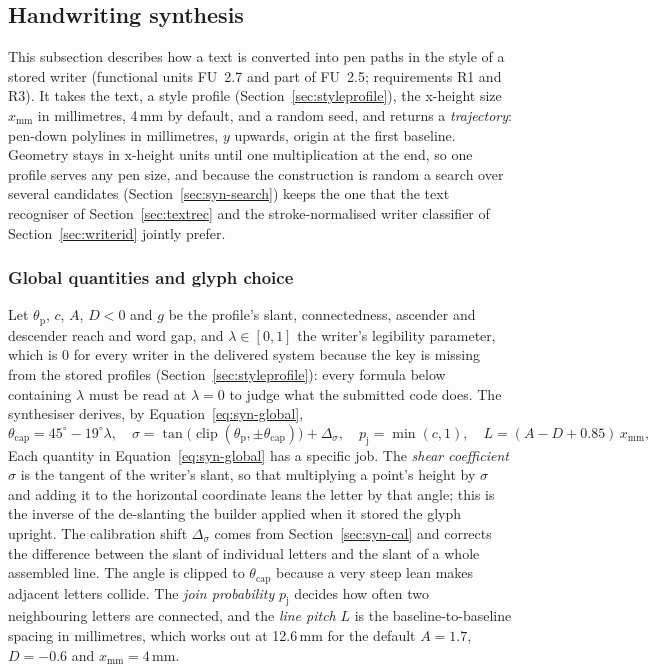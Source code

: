 \subsection{Handwriting synthesis}
\label{sec:synthesis}

This subsection describes how a text is converted into pen paths in the style of a stored writer (functional units FU~2.7 and part of FU~2.5; requirements R1 and R3).
It takes the text, a style profile (Section~\ref{sec:styleprofile}), the x-height size $x_{\mathrm{mm}}$ in millimetres, 4\,mm by default, and a random seed, and returns a \emph{trajectory}: pen-down polylines in millimetres, $y$ upwards, origin at the first baseline.
Geometry stays in x-height units until one multiplication at the end, so one profile serves any pen size, and because the construction is random a search over several candidates (Section~\ref{sec:syn-search}) keeps the one that the text recogniser of Section~\ref{sec:textrec} and the stroke-normalised writer classifier of Section~\ref{sec:writerid} jointly prefer.

\subsubsection{Global quantities and glyph choice}

Let $\theta_{\mathrm p}$, $c$, $A$, $D<0$ and $g$ be the profile's slant, connectedness, ascender and descender reach and word gap, and $\lambda\in[0,1]$ the writer's legibility parameter, which is 0 for every writer in the delivered system because the key is missing from the stored profiles (Section~\ref{sec:styleprofile}): every formula below containing $\lambda$ must be read at $\lambda=0$ to judge what the submitted code does.
The synthesiser derives, by Equation~\ref{eq:syn-global},
\begin{equation}
\theta_{\mathrm{cap}}=45^\circ-19^\circ\lambda,\quad\sigma=\tan\!\bigl(\operatorname{clip}(\theta_{\mathrm p},\pm\theta_{\mathrm{cap}})\bigr)+\Delta_\sigma,\quad p_{\mathrm j}=\min(c,1),\quad L=(A-D+0.85)\,x_{\mathrm{mm}},
\label{eq:syn-global}
\end{equation}
Each quantity in Equation~\ref{eq:syn-global} has a specific job. The \emph{shear coefficient} $\sigma$ is the tangent of the writer's slant, so that multiplying a point's height by $\sigma$ and adding it to the horizontal coordinate leans the letter by that angle; this is the inverse of the de-slanting the builder applied when it stored the glyph upright. The calibration shift $\Delta_\sigma$ comes from Section~\ref{sec:syn-cal} and corrects the difference between the slant of individual letters and the slant of a whole assembled line. The angle is clipped to $\theta_{\mathrm{cap}}$ because a very steep lean makes adjacent letters collide. The \emph{join probability} $p_{\mathrm j}$ decides how often two neighbouring letters are connected, and the \emph{line pitch} $L$ is the baseline-to-baseline spacing in millimetres, which works out at 12.6\,mm for the default $A=1.7$, $D=-0.6$ and $x_{\mathrm{mm}}=4$\,mm.

